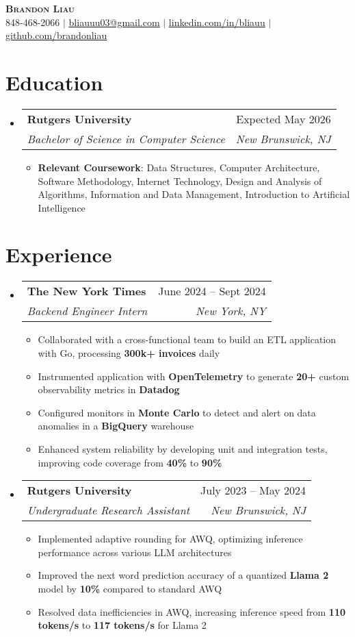 \documentclass[letterpaper,11pt]{article}
\makeatletter
\newcommand{\resumeItem}[1]{
  \item\small{
    {#1 \vspace{-2pt}}
  }
}
\newcommand{\resumeSubheading}[4]{
  \vspace{-2pt}\item
    \begin{tabular*}{0.97\textwidth}[t]{l@{\extracolsep{\fill}}r}
      \textbf{#1} & #2 \\
      \textit{\small#3} & \textit{\small #4} \\
    \end{tabular*}\vspace{-7pt}
}
\newcommand{\resumeSubHeadingListStart}{\begin{itemize}[leftmargin=0.15in, label={}]}
\newcommand{\resumeSubHeadingListEnd}{\end{itemize}}
\newcommand{\resumeItemListStart}{\begin{itemize}}
\newcommand{\resumeItemListEnd}{\end{itemize}\vspace{-3pt}}
\makeatother
\begin{document}
\begin{center}
    \textbf{\Huge \scshape Brandon Liau} \\ \vspace{8pt}
    \small {} 848-468-2066 $|$ 
    \href{mailto:x@x.com}{ \underline{bliauuu03@gmail.com}} $|$ 
    \href{https://linkedin.com/in/bliauu}{ \underline{linkedin.com/in/bliauu}} $|$
    \href{https://github.com/brandonliau}{ \underline{github.com/brandonliau}}
\end{center}


\section{Education}
  \resumeSubHeadingListStart
    \resumeSubheading
      {Rutgers University}{Expected May 2026}
      {Bachelor of Science in Computer Science}{New Brunswick, NJ}
      \resumeItemListStart
        \resumeItem{\textbf{Relevant Coursework}: Data Structures, Computer Architecture, Software Methodology, Internet Technology, Design and Analysis of Algorithms, Information and Data Management, Introduction to Artificial Intelligence}
      \resumeItemListEnd
  \resumeSubHeadingListEnd


\section{Experience}
  \resumeSubHeadingListStart
    \resumeSubheading
      {The New York Times}{June 2024 -- Sept 2024}
      {Backend Engineer Intern}{New York, NY}
      \resumeItemListStart
        \resumeItem{Collaborated with a cross-functional team to build an ETL application with Go, processing \textbf{300k+ invoices} daily}
        \resumeItem{Instrumented application with \textbf{OpenTelemetry} to generate \textbf{20+} custom observability metrics in \textbf{Datadog}}
        \resumeItem{Configured monitors in \textbf{Monte Carlo} to detect and alert on data anomalies in a \textbf{BigQuery} warehouse}
        \resumeItem{Enhanced system reliability by developing unit and integration tests, improving code coverage from \textbf{40\%} to \textbf{90\%}}
      \resumeItemListEnd
    \resumeSubheading
      {Rutgers University}{July 2023 -- May 2024}
      {Undergraduate Research Assistant}{New Brunswick, NJ}
      \resumeItemListStart
        \resumeItem{Implemented adaptive rounding for AWQ, optimizing inference performance across various LLM architectures}
        \resumeItem{Improved the next word prediction accuracy of a quantized \textbf{Llama 2} model by \textbf{10\%} compared to standard AWQ}
        \resumeItem{Resolved data inefficiencies in AWQ, increasing inference speed from \textbf{110 tokens/s} to \textbf{117 tokens/s} for Llama 2}
      \resumeItemListEnd
  \resumeSubHeadingListEnd
\end{document}
